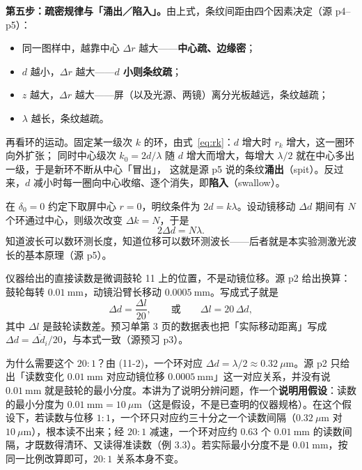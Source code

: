 \documentclass[11pt]{ctexart}
\newcommand{\Dl}{d}
\begin{document}
\textbf{第五步：疏密规律与「涌出／陷入」。}由上式，条纹间距由四个因素决定（源 p4--p5）：
\begin{itemize}
  \item 同一图样中，越靠中心 $\Delta r$ 越大——\textbf{中心疏、边缘密}；
  \item $\Dl$ 越小，$\Delta r$ 越大——\textbf{$\Dl$ 小则条纹疏}；
  \item $z$ 越大，$\Delta r$ 越大——屏（以及光源、两镜）离分光板越远，条纹越疏；
  \item $\lambda$ 越长，条纹越疏。
\end{itemize}
再看环的运动。固定某一级次 $k$ 的环，由式~\eqref{eq:rk}：$\Dl$ 增大时 $r_k$ 增大，这一圈环向外扩张；
同时中心级次 $k_0=2\Dl/\lambda$ 随 $\Dl$ 增大而增大，每增大 $\lambda/2$ 就在中心多出一级，于是新环不断从中心「冒出」，
这就是源 p5 说的条纹\textbf{涌出}（spit）。反过来，$\Dl$ 减小时每一圈向中心收缩、逐个消失，即\textbf{陷入}（swallow）。

在 $\delta_0=0$ 约定下取屏中心 $r=0$，明纹条件为 $2\Dl=k\lambda$。设动镜移动 $\Delta\Dl$ 期间有 $N$ 个环通过中心，则级次改变 $\Delta k=N$，于是
\begin{equation}
  2\Delta\Dl=N\lambda .
  \tag{11-2}
\end{equation}
知道波长可以数环测长度，知道位移可以数环测波长——后者就是本实验测激光波长的基本原理（源 p5）。



仪器给出的直接读数是微调鼓轮 11 上的位置，不是动镜位移。源 p2 给出换算：鼓轮每转 $0.01\ \mathrm{mm}$，动镜沿臂长移动 $0.0005\ \mathrm{mm}$。写成式子就是
\begin{equation}
  \Delta\Dl=\frac{\Delta l}{20},\qquad \text{或}\qquad \Delta l=20\,\Delta\Dl ,
  \label{eq:ratio}
\end{equation}
其中 $\Delta l$ 是鼓轮读数差。预习单第 3 页的数据表也把「实际移动距离」写成 $\Delta\Dl=\overline{\Delta\Dl_i}/20$，与本式一致（源预习 p3）。

为什么需要这个 $20:1$？由 (11-2)，一个环对应 $\Delta\Dl=\lambda/2\approx0.32\ \mu\mathrm{m}$。源 p2 只给出「读数变化 $0.01\ \mathrm{mm}$ 对应动镜位移 $0.0005\ \mathrm{mm}$」这一对应关系，并没有说 $0.01\ \mathrm{mm}$ 就是鼓轮的最小分度。本讲为了说明分辨问题，作一个\textbf{说明用假设}：读数的最小分度为 $0.01\ \mathrm{mm}=10\ \mu\mathrm{m}$（这是假设，不是已查明的仪器规格）。在这个假设下，若读数与位移 $1:1$，一个环只对应约三十分之一个读数间隔（$0.32\ \mu\mathrm{m}$ 对 $10\ \mu\mathrm{m}$），根本读不出来；经 $20:1$ 减速，一个环对应约 $0.63$ 个 $0.01\ \mathrm{mm}$ 的读数间隔，才既数得清环、又读得准读数（例 3.3）。若实际最小分度不是 $0.01\ \mathrm{mm}$，按同一比例改算即可，$20:1$ 关系本身不变。
\end{document}
